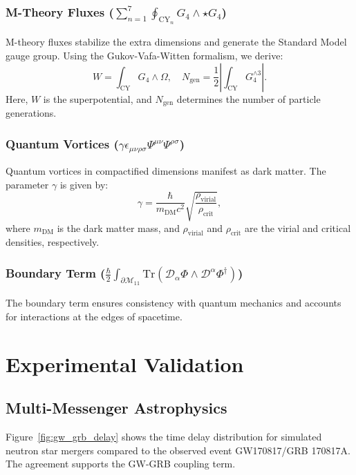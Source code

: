 \documentclass[12pt, a4paper]{article}
\begin{document}
\subsubsection{M-Theory Fluxes ($\sum_{n=1}^7 \oint_{\text{CY}_n} G_4 \wedge \star G_4$)}
M-theory fluxes stabilize the extra dimensions and generate the Standard Model gauge group. Using the Gukov-Vafa-Witten formalism, we derive:
\[
W = \int_{\text{CY}} G_4 \wedge \Omega,\quad N_{\text{gen}} = \frac{1}{2} \left| \int_{\text{CY}} G_4^{\wedge 3} \right|.
\]
Here, $W$ is the superpotential, and $N_{\text{gen}}$ determines the number of particle generations.

\subsubsection{Quantum Vortices ($\gamma \epsilon_{\mu\nu\rho\sigma} \Psi^{\mu\nu} \Psi^{\rho\sigma}$)}
Quantum vortices in compactified dimensions manifest as dark matter. The parameter $\gamma$ is given by:
\[
\gamma = \frac{\hbar}{m_{\text{DM}} c^2} \sqrt{\frac{\rho_{\text{virial}}}{\rho_{\text{crit}}}},
\]
where $m_{\text{DM}}$ is the dark matter mass, and $\rho_{\text{virial}}$ and $\rho_{\text{crit}}$ are the virial and critical densities, respectively.

\subsubsection{Boundary Term ($\frac{\hbar}{2} \int_{\partial\mathcal{M}_{11}} \text{Tr}\left( \mathcal{D}_\alpha \Phi \wedge \mathcal{D}^\alpha \Phi^\dagger \right)$)}
The boundary term ensures consistency with quantum mechanics and accounts for interactions at the edges of spacetime.

\section{Experimental Validation}
\subsection{Multi-Messenger Astrophysics}
Figure~\ref{fig:gw_grb_delay} shows the time delay distribution for simulated neutron star mergers compared to the observed event GW170817/GRB 170817A. The agreement supports the GW-GRB coupling term.
\end{document}
